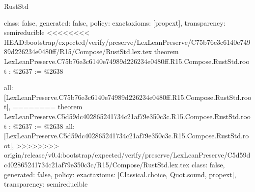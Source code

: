 \begin{lexlean}{RustStd}
\begin{coremodule}
{\begin{coremodule}
{{{{  class: false,
  generated: false,
  policy: exact{axioms: [propext]},
  transparency: semireducible
}
<<<<<<<< HEAD:bootstrap/expected/verify/preserve/LexLeanPreserve/C75b76e3c6140e74989d226234e0480ff/R15/Compose/RustStd.lex.tex
theorem LexLeanPreserve.C75b76e3c6140e74989d226234e0480ff.R15.Compose.RustStd.root : @2637 := @2638 {
  all: [LexLeanPreserve.C75b76e3c6140e74989d226234e0480ff.R15.Compose.RustStd.root],
========
theorem LexLeanPreserve.C5d59dc402865241734c21af79e350c3c.R15.Compose.RustStd.root : @2637 := @2638 {
  all: [LexLeanPreserve.C5d59dc402865241734c21af79e350c3c.R15.Compose.RustStd.root],
>>>>>>>> origin/release/v0.4:bootstrap/expected/verify/preserve/LexLeanPreserve/C5d59dc402865241734c21af79e350c3c/R15/Compose/RustStd.lex.tex
  class: false,
  generated: false,
  policy: exact{axioms: [Classical.choice, Quot.sound, propext]},
  transparency: semireducible
}

}}}}
\end{coremodule}}
\end{coremodule}
\end{lexlean}
